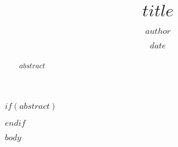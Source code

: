 \documentclass[12pt,a4paper]{article}
\title{$title$}
\author{$author$}
\date{$date$}
\begin{document}
\maketitle

$if(abstract)$
\begin{abstract}
$abstract$
\end{abstract}
$endif$

$body$
\end{document}
